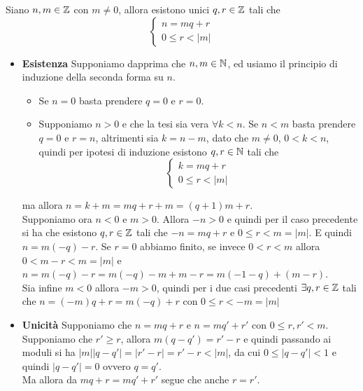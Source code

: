\documentclass[a4paper,12pt]{article}
\begin{document}
{
	Siano $n, m \in \mathbb{Z}$ con $m \neq 0$, allora esistono unici $q, r \in \mathbb{Z}$ tali che
	\[ \begin{cases}
			n = mq + r \\
			0 \leq r < |m|
		\end{cases} \]
}
{
\begin{itemize}
	\item \textbf{Esistenza} Supponiamo dapprima che $n, m \in \mathbb{N}$, ed usiamo il principio di induzione della seconda forma su $n$.
		\begin{itemize}
			\item Se $n = 0$ basta prendere $q = 0$ e $r = 0$.
			\item Supponiamo $n > 0$ e che la tesi sia vera $\forall k < n$. Se $n < m$ basta prendere $q = 0$ e $r = n$, altrimenti sia $k = n - m$, dato che $m\neq 0$, $0 < k < n$, quindi per ipotesi di induzione esistono $q, r \in \mathbb{N}$ tali che
			\[ \begin{cases}
				k = mq + r \\
				0 \leq r < |m|
			\end{cases} \]
		\end{itemize}
		ma allora $n = k + m = mq + r + m = (q + 1)m + r$. \\
		Supponiamo ora $n < 0$ e $m > 0$. Allora $-n > 0$ e quindi per il caso precedente si ha che esistono $q, r \in \mathbb{Z}$ tali che $-n = mq + r$ e $0 \leq r < m = |m|$. E quindi $n = m(-q) - r$. Se $r = 0$ abbiamo finito, se invece $0 < r < m$ allora $0 < m - r < m = |m|$ e $n = m(-q) - r = m(-q) -m +m -r = m(-1 -q) + (m-r)$.\\
		Sia infine $m < 0$ allora $-m > 0$, quindi per i due casi precedenti $\exists q, r \in \mathbb{Z}$ tali che $n = (-m)q + r = m(-q) + r$ con $0 \leq r < -m = |m|$
	\item \textbf{Unicità} Supponiamo che $n = mq + r$ e $n = mq' + r'$ con $0 \leq r, r' < m$. \\
		Supponiamo che $r' \geq r$, allora $m(q - q') = r' - r$ e quindi passando ai moduli si ha $|m||q - q'| = |r' - r| = r' - r < |m|$, da cui $0 \leq |q - q'| < 1$ e quindi $|q - q'| = 0$ ovvero $q = q'$.\\
		Ma allora da $mq + r = mq' + r'$ segue che anche $r = r'$.
\end{itemize}
}
\end{document}
